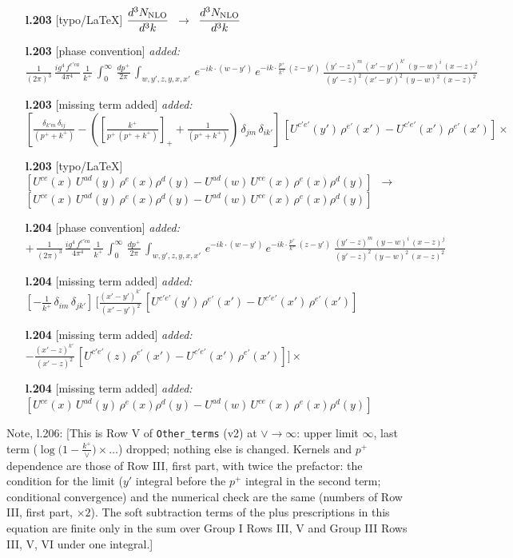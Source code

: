 \documentclass[10pt]{article}
\newenvironment{notebox}{\def\FrameCommand{{\color{notebar}\vrule width 1.5pt}\hspace{6pt}}\MakeFramed{\advance\hsize-\width\FrameRestore}\small}{\endMakeFramed}
\begin{document}
\begin{itemize}[leftmargin=2.2em,itemsep=1pt,topsep=2pt]
\item[\textbf{l.203}] \textsf{\small [typo/LaTeX]} $\displaystyle \frac{d^{3}N_{\rm NLO}}{d^{3}k}$\ $\longrightarrow$\ $\displaystyle \frac{d^{3}N_{\rm NLO}}{d^{3}k}$
\item[\textbf{l.203}] \textsf{\small [phase convention]} \emph{added:} $\displaystyle \frac{1}{(2\pi)^{3}}\, \frac{ig^{4}\,f^{c'ca}}{4\pi^{4}}\, \frac{1}{k^{+}}\,\int_{0}^{\infty}\, \frac{dp^{+}}{2\pi}\, \int_{w,y',z,y,x,x'}\, e^{-ik\cdot (w-y')}\, e^{-ik\cdot \frac{p^{+}}{k^{+}}\,(z-y')}\,\frac{(y'-z)^{m}\,(x'-y')^{k'}\,(y-w)^{i}\,(x-z)^{j}}{(y'-z)^{2}\,(x'-y')^{2}\,(y-w)^{2}\,(x-z)^{2}}$
\item[\textbf{l.203}] \textsf{\small [missing term added]} \emph{added:} $\displaystyle [\frac{\delta_{k'm}\,\delta_{ij}}{(p^{+}+k^{+})}-([\frac{k^{+}}{p^{+}\,(p^{+}+k^{+})}]_{+}+\frac{1}{(p^{+}+k^{+})})\,\delta_{jm}\,\delta_{ik'}]\, [U^{c'e'}(y')\,\rho^{e'}(x')-U^{c'e'}(x')\,\rho^{e'}(x')]\times$
\item[\textbf{l.203}] \textsf{\small [typo/LaTeX]} $\displaystyle [U^{ce}(x)\,U^{ad}(y)\,\rho^{e}(x)\rho^{d}(y)-U^{ad}(w)\,U^{ce}(x)\,\rho^{e}(x)\rho^{d}(y)]$\ $\longrightarrow$\ $\displaystyle [U^{ce}(x)\,U^{ad}(y)\,\rho^{e}(x)\rho^{d}(y)-U^{ad}(w)\,U^{ce}(x)\,\rho^{e}(x)\rho^{d}(y)]$
\item[\textbf{l.204}] \textsf{\small [phase convention]} \emph{added:} $\displaystyle +\,\frac{1}{(2\pi)^{3}}\, \frac{ig^{4}\,f^{c'ca}}{4\pi^{4}}\, \frac{1}{k^{+}}\,\int_{0}^{\infty}\, \frac{dp^{+}}{2\pi}\, \int_{w,y',z,y,x,x'}\, e^{-ik\cdot (w-y')}\, e^{-ik\cdot \frac{p^{+}}{k^{+}}\,(z-y')}\,\frac{(y'-z)^{m}\,(y-w)^{i}\,(x-z)^{j}}{(y'-z)^{2}\,(y-w)^{2}\,(x-z)^{2}}$
\item[\textbf{l.204}] \textsf{\small [missing term added]} \emph{added:} $\displaystyle [-\frac{1}{k^{+}}\, \delta_{im}\, \delta_{jk'}]\, \Bigg[\frac{(x'-y')^{k'}}{(x'-y')^{2}}\,[U^{c'e'}(y')\,\rho^{e'}(x')-U^{c'e'}(x')\,\rho^{e'}(x')]$
\item[\textbf{l.204}] \textsf{\small [missing term added]} \emph{added:} $\displaystyle -\frac{(x'-z)^{k'}}{(x'-z)^{2}}\,[U^{c'e'}(z)\,\rho^{e'}(x')-U^{c'e'}(x')\,\rho^{e'}(x')]\Bigg]\times$
\item[\textbf{l.204}] \textsf{\small [missing term added]} \emph{added:} $\displaystyle [U^{ce}(x)\,U^{ad}(y)\,\rho^{e}(x)\rho^{d}(y)-U^{ad}(w)\,U^{ce}(x)\,\rho^{e}(x)\rho^{d}(y)]$
\end{itemize}
\begin{notebox}\textsf{\small Note, l.206:} [This is Row V of \texttt{Other\_terms} (v2) at $\vee\to\infty$: upper limit $\infty$, last term ($\log\big(1-\frac{k^{+}}{\vee}\big)\times\dots$) dropped; nothing else is changed. Kernels and $p^{+}$ dependence are those of Row III, first part, with twice the prefactor: the condition for the limit ($y'$ integral before the $p^{+}$ integral in the second term; conditional convergence) and the numerical check are the same (numbers of Row III, first part, $\times2$). The soft subtraction terms of the plus prescriptions in this equation are finite only in the sum over Group I Rows III, V and Group III Rows III, V, VI under one integral.]\end{notebox}
\end{document}
